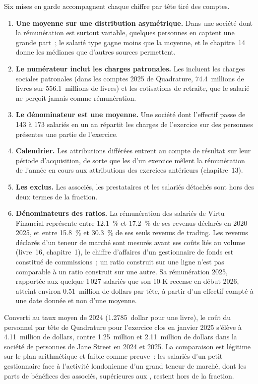 Six mises en garde accompagnent chaque chiffre par tête tiré des comptes.
\begin{enumerate}
\item \textbf{Une moyenne sur une distribution asymétrique.} Dans une société dont la rémunération est surtout variable, quelques personnes en captent une grande
part~; le salarié type gagne moins que la moyenne, et le chapitre~14 donne les médianes que d'autres sources permettent.
\item \textbf{Le numérateur inclut les charges patronales.} Les  incluent les charges sociales patronales
(dans les comptes 2025 de Quadrature, 74.4~millions de livres sur 556.1~millions de livres) et les cotisations de retraite, que le
salarié ne perçoit jamais comme rémunération.
\item \textbf{Le dénominateur est une moyenne.} Une société dont l'effectif passe de 143 à 173 salariés en un an répartit les charges de l'exercice
sur des personnes présentes une partie de l'exercice.
\item \textbf{Calendrier.} Les attributions différées entrent au compte de résultat sur leur période d'acquisition, de sorte que les 
d'un exercice mêlent la rémunération de l'année en cours aux attributions des exercices antérieurs (chapitre~13).
\item \textbf{Les exclus.} Les associés, les prestataires et les salariés détachés sont hors des deux termes de la fraction.
\item \textbf{Dénominateurs des ratios.} La rémunération des salariés de Virtu Financial représente entre 12.1~\% et 17.2~\% de ses revenus déclarés
en 2020--2025, et entre 15.8~\% et 30.3~\% de ses seuls revenus de trading. Les revenus déclarés d'un teneur de marché sont mesurés
avant ses coûts liés au volume (livre~16, chapitre~1), le chiffre d'affaires d'un gestionnaire de fonds est constitué de commissions~; un ratio construit sur une ligne n'est pas
comparable à un ratio construit sur une autre. Sa rémunération 2025, rapportée aux quelque 1\,027 salariés que son 10-K recense en début 2026, atteint
environ 0.51~million de dollars par tête, à partir d'un effectif compté à une date donnée et non d'une moyenne.
\end{enumerate}

Converti au taux moyen de 2024 (1.2785~dollar pour une livre), le coût du personnel par tête de Quadrature pour l'exercice clos en janvier
2025 s'élève à 4.11~million de dollars, contre 1.25~million et 2.11~million de dollars dans la société de personnes de Jane Street en 2024 et 2025. La
comparaison est légitime sur le plan arithmétique et faible comme preuve~: les salariés d'un petit gestionnaire face à l'activité londonienne d'un grand
teneur de marché, dont les parts de bénéfices des associés, supérieures aux , restent hors de la fraction.

